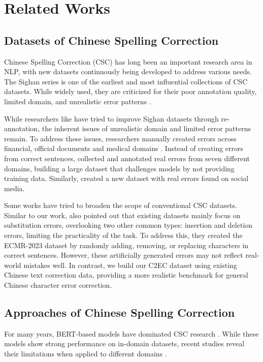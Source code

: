 \section{Related Works}
\label{sec:related_work}

\subsection{Datasets of Chinese Spelling Correction}
Chinese Spelling Correction (CSC) has long been an important research area in NLP, with new datasets continuously being developed to address various needs.
The Sighan series \cite{wu-etal-2013-chinese,yu-etal-2014-overview,tseng-etal-2015-introduction} is one of the earliest and most influential collections of CSC datasets.
While widely used, they are criticized for their poor annotation quality, limited domain, and unrealistic error patterns \cite{yang-etal-2023-chinese,wu-etal-2023-rethinking,sun-etal-2024-two}.

While researchers like \cite{yang-etal-2023-chinese,sun-etal-2024-two} have tried to improve Sighan datasets through re-annotation, the inherent issues of unrealistic domain and limited error patterns remain.
To address these issues, researchers manually created errors across financial, official documents and medical domains \cite{lv-etal-2023-ecspell,jiang-etal-2022-mcscset}.
Instead of creating errors from correct sentences, \citet{wu-etal-2023-rethinking} collected and annotated real errors from seven different domains, building a large dataset that challenges models by not providing training data. Similarly, \citet{hu-etal-2024-cscd} created a new dataset with real errors found on social media.

Some works have tried to broaden the scope of conventional CSC datasets.
Similar to our work, \citet{he-etal-2023-umrspell} also pointed out that existing datasets mainly focus on substitution errors, overlooking two other common types: insertion and deletion errors, limiting the practicality of the task.
To address this, they created the ECMR-2023 dataset by randomly adding, removing, or replacing characters in correct sentences.
However, these artificially generated errors may not reflect real-world mistakes well.
In contrast, we build our C2EC dataset using existing Chinese text correction data, providing a more realistic benchmark for general Chinese character error correction.

\subsection{Approaches of Chinese Spelling Correction}
For many years, BERT-based models have dominated CSC research \cite{zhang-etal-2020-spelling,xu-etal-2021-read,zhu-etal-2022-mdcspell,liang-etal-2023-disentangled}.
While these models show strong performance on in-domain datasets, recent studies reveal their limitations when applied to different domains \cite{wu-etal-2023-rethinking,liu-etal-2024-rephrasing}.

